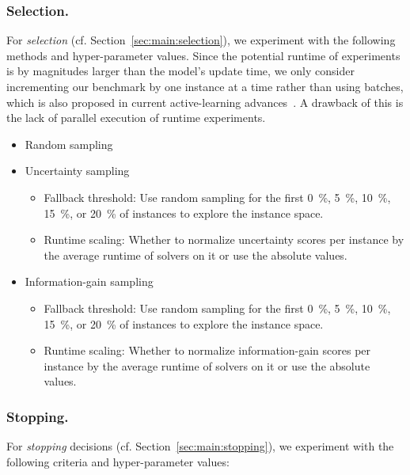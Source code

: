 \documentclass[runningheads]{llncs}
\begin{document}
\subsubsection{Selection.}

For \emph{selection} (cf. Section~\ref{sec:main:selection}), we experiment with the following methods and hyper-parameter values.
Since the potential runtime of experiments is by magnitudes larger than the model's update time, we only consider incrementing our benchmark by one instance at a time rather than using batches, which is also proposed in current active-learning advances~\cite{SinhaED19,2019gaal}.
A drawback of this is the lack of parallel execution of runtime experiments.

\begin{itemize}
  \item Random sampling 
  \item Uncertainty sampling
  \begin{itemize}
    \item Fallback threshold: Use random sampling for the first \SI{0}{\%}, \SI{5}{\%}, \SI{10}{\%}, \SI{15}{\%}, or \SI{20}{\%} of instances to explore the instance space.
    \item Runtime scaling: Whether to normalize uncertainty scores per instance by the average runtime of solvers on it or use the absolute values.
  \end{itemize}

  \item Information-gain sampling
  \begin{itemize}
    \item Fallback threshold: Use random sampling for the first \SI{0}{\%}, \SI{5}{\%}, \SI{10}{\%}, \SI{15}{\%}, or \SI{20}{\%} of instances to explore the instance space.
    \item Runtime scaling: Whether to normalize information-gain scores per instance by the average runtime of solvers on it or use the absolute values.
  \end{itemize}
\end{itemize}

\subsubsection{Stopping.}

For \emph{stopping} decisions (cf. Section~\ref{sec:main:stopping}), we experiment with the following criteria and hyper-parameter values:
\end{document}
